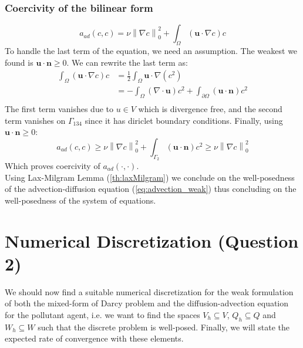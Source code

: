 \documentclass[conference]{IEEEtran}
\newcommand{\norm}[1]{\left\lVert#1\right\rVert}
\begin{document}
\subsubsection{Coercivity of the bilinear form} 
\begin{equation}
      a_{ad}(c,c) = \nu \norm{\nabla c}_0^2 + \int_{\Omega} (\textbf{u}\cdot \nabla c) c
\end{equation}
To handle the last term of the equation, we need an assumption. The weakest we found is $\textbf{u} \cdot \textbf{n} \geq 0$. We can rewrite the last term as:
\begin{align}
      \int_{\Omega} (\textbf{u}\cdot \nabla c) c 
      & = \frac{1}{2} \int_{\Omega} \textbf{u}\cdot \nabla (c^2) \\
      & = - \int_{\Omega} (\nabla \cdot \textbf{u}) c^2 + \int_{\partial \Omega} (\textbf{u} \cdot \textbf{n}) c^2 \\
\end{align}
The first term vanishes due to $u\in V$ which is divergence free, and the second term vanishes on $\Gamma_{134}$ since it has diriclet boundary conditions.
Finally, using $\textbf{u} \cdot \textbf{n} \geq 0$:
\begin{equation}
      a_{ad}(c,c) \geq \nu \norm{\nabla c}_0^2 + \int_{\Gamma_2} (\textbf{u}\cdot \textbf{n}) c^2
      \geq \nu \norm{\nabla c}_0^2
\end{equation}
Which proves coercivity of $a_{ad}(\cdot,\cdot)$.\\



Using Lax-Milgram Lemma (\ref{th:laxMilgram}) we conclude on the well-posedness of the advection-diffusion equation (\ref{eq:advection_weak}) thus concluding on the well-posedness of the system of equations.


\section{Numerical Discretization (Question 2)}
We should now find a suitable numerical discretization for the weak formulation of both the mixed-form of Darcy problem and the diffusion-advection equation for the pollutant agent, i.e. we want to find the spaces $V_h \subseteq V$, $Q_h \subseteq Q$ and  $W_h \subseteq W$ such that the discrete problem is well-posed. Finally, we will state the expected rate of convergence with these elements. \\ 
\end{document}
